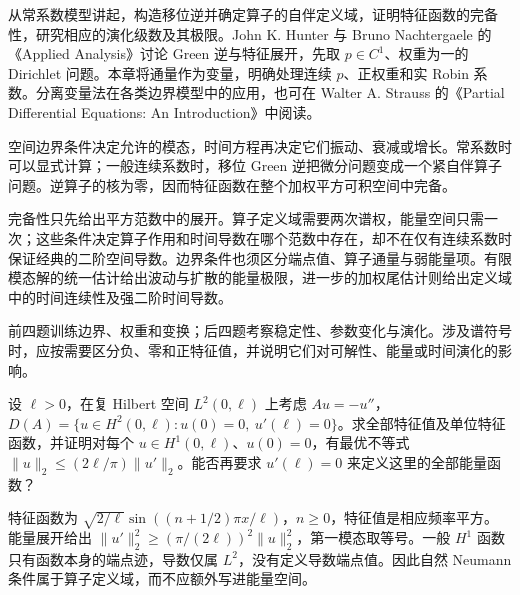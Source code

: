 从常系数模型讲起，构造移位逆并确定算子的自伴定义域，证明特征函数的完备性，研究相应的演化级数及其极限。John K. Hunter 与 Bruno Nachtergaele 的《Applied Analysis》\cite[Section 10.5, pp. 268--272]{Hunter2001Applied}讨论 Green 逆与特征展开，先取 \(p\in C^1\)、权重为一的 Dirichlet 问题。本章将通量作为变量，明确处理连续 \(p\)、正权重和实 Robin 系数。分离变量法在各类边界模型中的应用，也可在 Walter A. Strauss 的《Partial Differential Equations: An Introduction》\cite{Strauss2008Partial}中阅读。





\begin{chaptersummary}
空间边界条件决定允许的模态，时间方程再决定它们振动、衰减或增长。常系数时可以显式计算；一般连续系数时，移位 Green 逆把微分问题变成一个紧自伴算子问题。逆算子的核为零，因而特征函数在整个加权平方可积空间中完备。

\ProseParagraphBreak

完备性只先给出平方范数中的展开。算子定义域需要两次谱权，能量空间只需一次；这些条件决定算子作用和时间导数在哪个范数中存在，却不在仅有连续系数时保证经典的二阶空间导数。边界条件也须区分端点值、算子通量与弱能量项。有限模态解的统一估计给出波动与扩散的能量极限，进一步的加权尾估计则给出定义域中的时间连续性及强二阶时间导数。
\end{chaptersummary}


\BookExercises

前四题训练边界、权重和变换；后四题考察稳定性、参数变化与演化。涉及谱符号时，应按需要区分负、零和正特征值，并说明它们对可解性、能量或时间演化的影响。

\begin{exercise}\label{b2:ex:10-mixed-best-constant}
设 \(\ell>0\)，在复 Hilbert 空间 \(L^2(0,\ell)\) 上考虑 \(Au=-u''\)，\(D(A)=\{u\in H^2(0,\ell):u(0)=0,\ u'(\ell)=0\}\)。求全部特征值及单位特征函数，并证明对每个 \(u\in H^1(0,\ell)\)、\(u(0)=0\)，有最优不等式 \(\|u\|_2\leq(2\ell/\pi)\|u'\|_2\)。能否再要求 \(u'(\ell)=0\) 来定义这里的全部能量函数？
\end{exercise}
\begin{solution}
特征函数为 \(\sqrt{2/\ell}\sin((n+1/2)\pi x/\ell)\)，\(n\geq0\)，特征值是相应频率平方。能量展开给出 \(\|u'\|_2^2\geq(\pi/(2\ell))^2\|u\|_2^2\)，第一模态取等号。一般 \(H^1\) 函数只有函数本身的端点迹，导数仅属 \(L^2\)，没有定义导数端点值。因此自然 Neumann 条件属于算子定义域，而不应额外写进能量空间。
\end{solution}

